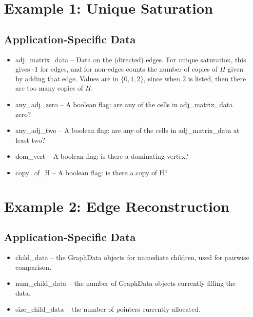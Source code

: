 \documentclass[11pt]{article}
\begin{document}
\section{Example 1: Unique Saturation}

\subsection{Application-Specific Data}

\begin{itemize}
	\item adj\_matrix\_data -- Data on the (directed) edges.
		For unique saturation, this gives -1 for edges, and 
			for non-edges counts the number of copies of $H$
			given by adding that edge.
		Values are in $\{0,1,2\}$, since when $2$ is 
			listed, then there are too many copies of $H$.

	\item any\_adj\_zero -- A boolean flag: are any of the cells in adj\_matrix\_data zero?
		

	\item any\_adj\_two -- A boolean flag:  are any of the cells in adj\_matrix\_data at least two?
	
	\item dom\_vert -- A boolean flag: is there a dominating vertex?

	\item copy\_of\_H -- A boolean flag: is there a copy of H?

\end{itemize}



\section{Example 2: Edge Reconstruction}

\subsection{Application-Specific Data}

\begin{itemize}
	
	\item child\_data -- the GraphData objects for immediate children, used for pairwise comparison.
	
	\item num\_child\_data -- the number of GraphData objects currently filling the data.
	\item size\_child\_data -- the number of pointers currently allocated.
\end{itemize}
\end{document}
